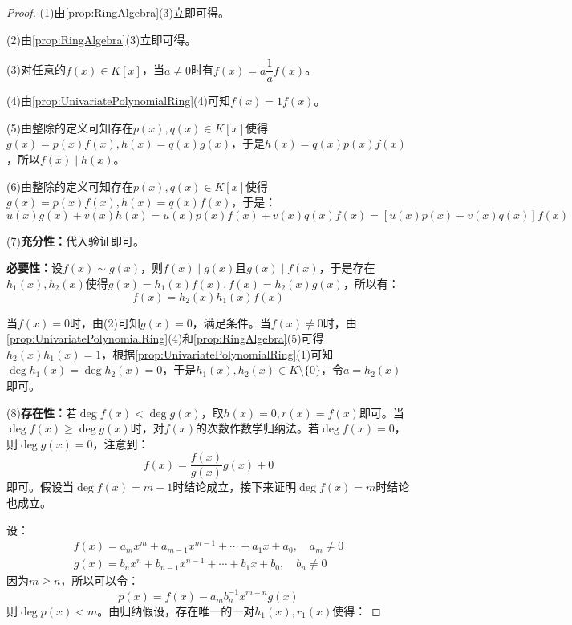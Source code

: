 \begin{proof}
	(1)由\cref{prop:RingAlgebra}(3)立即可得。\par
	(2)由\cref{prop:RingAlgebra}(3)立即可得。\par
	(3)对任意的$f(x)\in K[x]$，当$a\ne0$时有$f(x)=a\dfrac{1}{a}f(x)$。\par
	(4)由\cref{prop:UnivariatePolynomialRing}(4)可知$f(x)=1f(x)$。\par
	(5)由整除的定义可知存在$p(x),q(x)\in K[x]$使得$g(x)=p(x)f(x),h(x)=q(x)g(x)$，于是$h(x)=q(x)p(x)f(x)$，所以$f(x)\mid h(x)$。\par
	(6)由整除的定义可知存在$p(x),q(x)\in K[x]$使得$g(x)=p(x)f(x),h(x)=q(x)f(x)$，于是：
	\begin{equation*}
		u(x)g(x)+v(x)h(x)=u(x)p(x)f(x)+v(x)q(x)f(x)=[u(x)p(x)+v(x)q(x)]f(x)
	\end{equation*}\par
	(7)\textbf{充分性：}代入验证即可。\par
	\textbf{必要性：}设$f(x)\sim g(x)$，则$f(x)\mid g(x)$且$g(x)\mid f(x)$，于是存在$h_1(x),h_2(x)$使得$g(x)=h_1(x)f(x),f(x)=h_2(x)g(x)$，所以有：
	\begin{equation*}
		f(x)=h_2(x)h_1(x)f(x)
	\end{equation*}\par
	当$f(x)=0$时，由(2)可知$g(x)=0$，满足条件。当$f(x)\ne0$时，由\cref{prop:UnivariatePolynomialRing}(4)和\cref{prop:RingAlgebra}(5)可得$h_2(x)h_1(x)=1$，根据\cref{prop:UnivariatePolynomialRing}(1)可知$\deg h_1(x)=\deg h_2(x)=0$，于是$h_1(x),h_2(x)\in K\setminus\{0\}$，令$a=h_2(x)$即可。\par
	(8)\textbf{存在性：}若$\deg f(x)<\deg g(x)$，取$h(x)=0,r(x)=f(x)$即可。当$\deg f(x)\geqslant\deg g(x)$时，对$f(x)$的次数作数学归纳法。若$\deg f(x)=0$，则$\deg g(x)=0$，注意到：
	\begin{equation*}
		f(x)=\frac{f(x)}{g(x)}g(x)+0
	\end{equation*}
	即可。假设当$\deg f(x)=m-1$时结论成立，接下来证明$\deg f(x)=m$时结论也成立。\par
	设：
	\begin{gather*}
		f(x)=a_mx^m+a_{m-1}x^{m-1}+\cdots+a_1x+a_0,\quad a_m\ne0 \\
		g(x)=b_nx^n+b_{n-1}x^{n-1}+\cdots+b_1x+b_0,\quad b_n\ne0
	\end{gather*}
	因为$m\geqslant n$，所以可以令：
	\begin{equation*}
		p(x)=f(x)-a_mb_n^{-1}x^{m-n}g(x)
	\end{equation*}
	则$\deg p(x)<m$。由归纳假设，存在唯一的一对$h_1(x),r_1(x)$使得：

\end{proof}
